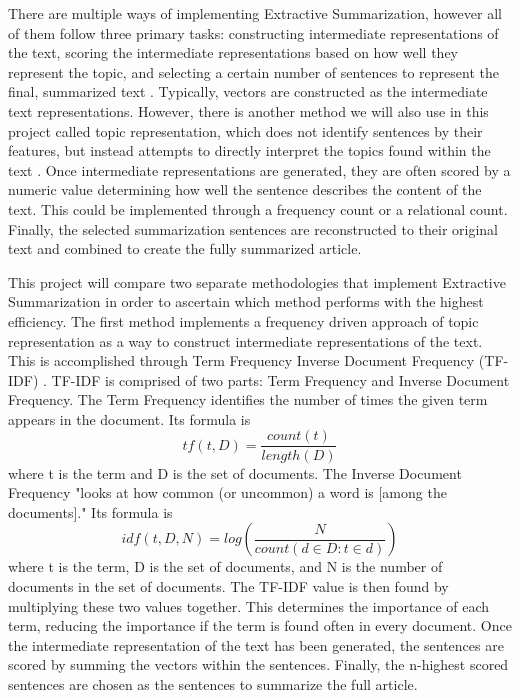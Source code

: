 \documentclass{IEEEtran}
\begin{document}
There are multiple ways of implementing Extractive Summarization, however all of them follow three primary tasks: constructing intermediate representations of the text, scoring the intermediate representations based on how well they represent the topic, and selecting a certain number of sentences to represent the final, summarized text \cite{related_summarization}. Typically, vectors are constructed as the intermediate text representations. However, there is another method we will also use in this project called topic representation, which does not identify sentences by their features, but instead attempts to directly interpret the topics found within the text \cite{related_summarization}. Once intermediate representations are generated, they are often scored by a numeric value determining how well the sentence describes the content of the text. This could be implemented through a frequency count or a relational count. Finally, the selected summarization sentences are reconstructed to their original text and combined to create the fully summarized article.

This project will compare two separate methodologies that implement Extractive Summarization in order to ascertain which method performs with the highest efficiency. The first method implements a frequency driven approach of topic representation as a way to construct intermediate representations of the text. This is accomplished through Term Frequency Inverse Document Frequency (TF-IDF) \cite{tf-idf}. TF-IDF is comprised of two parts: Term Frequency and Inverse Document Frequency. The Term Frequency identifies the number of times the given term appears in the document. Its formula is 
\[tf(t, D) = \frac{count(t)}{length(D)}\]
where t is the term and D is the set of documents. The Inverse Document Frequency "looks at how common (or uncommon) a word is [among the documents]." \cite{tf-idf} Its formula is
\[idf(t, D, N) = log(\frac{N}{count(d \in D:t \in d)})\]
where t is the term, D is the set of documents, and N is the number of documents in the set of documents. The TF-IDF value is then found by multiplying these two values together. This determines the importance of each term, reducing the importance if the term is found often in every document. Once the intermediate representation of the text has been generated, the sentences are scored by summing the vectors within the sentences. Finally, the n-highest scored sentences are chosen as the sentences to summarize the full article.
\end{document}
